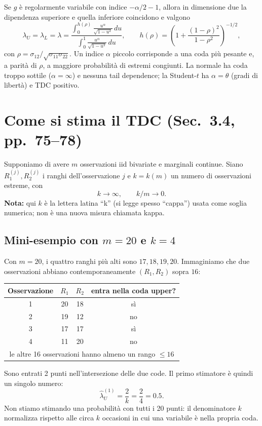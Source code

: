 \documentclass[11pt,a4paper]{article}
\begin{document}
Se $g$ è regolarmente variabile con indice $-\alpha/2-1$, allora in
dimensione due la dipendenza superiore e quella inferiore coincidono e
valgono
\begin{equation}
 \lambda_U=\lambda_L=\lambda
 =\frac{\displaystyle\int_0^{h(\rho)}
       \frac{u^\alpha}{\sqrt{1-u^2}}\,du}
       {\displaystyle\int_0^1\frac{u^\alpha}{\sqrt{1-u^2}}\,du},
 \qquad
 h(\rho)=\left(1+\frac{(1-\rho)^2}{1-\rho^2}\right)^{-1/2},
 \label{eq:elliptical-tdc}
\end{equation}
con $\rho=\sigma_{12}/\sqrt{\sigma_{11}\sigma_{22}}$. Un indice $\alpha$
piccolo corrisponde a una coda più pesante e, a parità di $\rho$, a maggiore
probabilità di estremi congiunti. La normale ha coda troppo sottile
($\alpha=\infty$) e nessuna tail dependence; la Student-$t$ ha
$\alpha=\theta$ (gradi di libertà) e TDC positivo.

\section{Come si stima il TDC (Sec.~3.4, pp.~75--78)}

Supponiamo di avere $m$ osservazioni iid bivariate e marginali continue.
Siano $R_1^{(j)},R_2^{(j)}$ i ranghi dell'osservazione $j$ e $k=k(m)$ un numero
di osservazioni estreme, con
\begin{equation}
  k\longrightarrow\infty,\qquad k/m\longrightarrow0.
\end{equation}
\textbf{Nota:} qui $k$ è la lettera latina ``k'' (si legge spesso ``cappa'')
usata come soglia numerica; non è una nuova misura chiamata kappa.

\subsection{Mini-esempio con $m=20$ e $k=4$}
Con $m=20$, i quattro ranghi più alti sono $17,18,19,20$. Immaginiamo che
due osservazioni abbiano contemporaneamente $(R_1,R_2)$ sopra $16$:
\begin{center}
\begin{tabular}{c|c|c|c}
Osservazione & $R_1$ & $R_2$ & entra nella coda upper?\\
\midrule
1 & 20 & 18 & sì\\
2 & 19 & 12 & no\\
3 & 17 & 17 & sì\\
4 & 11 & 20 & no\\
\multicolumn{4}{c}{\small le altre 16 osservazioni hanno almeno un rango $\leq16$}
\end{tabular}
\end{center}
Sono entrati 2 punti nell'intersezione delle due code. Il primo stimatore è
quindi un singolo numero:
\[
  \widehat\lambda_{U}^{(1)}=\frac{2}{k}=\frac{2}{4}=0.5.
\]
Non stiamo stimando una probabilità con tutti i 20 punti: il denominatore $k$
normalizza rispetto alle circa $k$ occasioni in cui una variabile è nella
propria coda.
\end{document}
